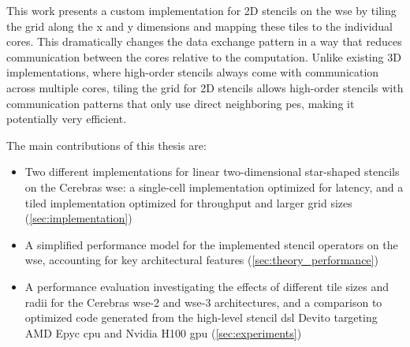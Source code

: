This work presents a custom implementation for 2D stencils on the \ac{wse} by tiling the grid along the x and y dimensions and mapping these tiles to the individual cores.
This dramatically changes the data exchange pattern in a way that reduces communication between the cores relative to the computation.
Unlike existing 3D implementations, where high-order stencils always come with communication across multiple cores, tiling the grid for 2D stencils allows high-order stencils with communication patterns that only use direct neighboring \acp{pe}, making it potentially very efficient.

The main contributions of this thesis are:
\begin{itemize}
    \item Two different implementations for linear two-dimensional star-shaped stencils on the Cerebras \ac{wse}: a single-cell implementation optimized for latency, and a tiled implementation optimized for throughput and larger grid sizes (\autoref{sec:implementation})
    \item A simplified performance model for the implemented stencil operators on the \ac{wse}, accounting for key architectural features (\autoref{sec:theory_performance})
    \item A performance evaluation investigating the effects of different tile sizes and radii for the Cerebras \ac{wse}-2 and \ac{wse}-3 architectures, and a comparison to optimized code generated from the high-level stencil \ac{dsl} Devito targeting AMD Epyc \ac{cpu} and Nvidia H100 \ac{gpu} (\autoref{sec:experiments})
\end{itemize}
